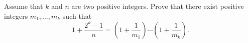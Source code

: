 Assume that 
$k$
 and 
$n$
 are two positive integers. Prove that there exist positive integers 
$m_1 , \dots , m_k$
 such that 
\[1+\frac{2^k-1}{n}=\left(1+\frac1{m_1}\right)\cdots \left(1+\frac1{m_k}\right).\]
